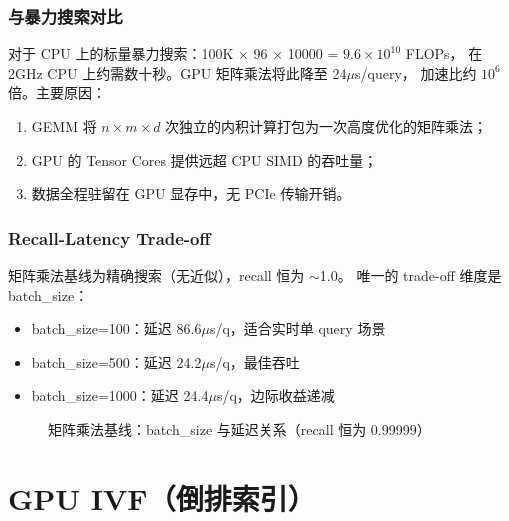 \documentclass[UTF8,a4paper,10pt]{ctexart}
\begin{document}
\subsubsection{与暴力搜索对比}

对于 CPU 上的标量暴力搜索：100K $\times$ 96 $\times$ 10000 = $9.6 \times 10^{10}$ FLOPs，
在 2GHz CPU 上约需数十秒。GPU 矩阵乘法将此降至 24$\mu$s/query，
加速比约 $10^6$ 倍。主要原因：
\begin{enumerate}[itemsep=0pt]
\item GEMM 将 $n \times m \times d$ 次独立的内积计算打包为一次高度优化的矩阵乘法；
\item GPU 的 Tensor Cores 提供远超 CPU SIMD 的吞吐量；
\item 数据全程驻留在 GPU 显存中，无 PCIe 传输开销。
\end{enumerate}

\subsubsection{Recall-Latency Trade-off}

矩阵乘法基线为精确搜索（无近似），recall 恒为 $\sim$1.0。
唯一的 trade-off 维度是 batch\_size：
\begin{itemize}[itemsep=0pt]
\item batch\_size=100：延迟 86.6$\mu$s/q，适合实时单 query 场景
\item batch\_size=500：延迟 24.2$\mu$s/q，最佳吞吐
\item batch\_size=1000：延迟 24.4$\mu$s/q，边际收益递减
\end{itemize}

\begin{figure}[H]
\centering
{}
\caption{矩阵乘法基线：batch\_size 与延迟关系（recall 恒为 0.99999）}
\label{fig:matmul-batch}
\end{figure}

\section{GPU IVF（倒排索引）}
\label{sec:ivf}
\end{document}
